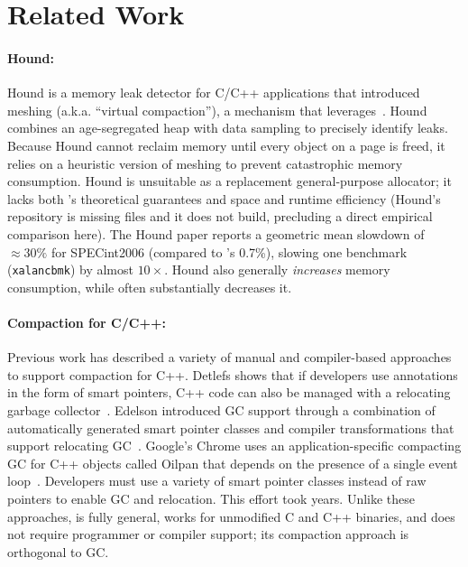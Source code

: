 \section{Related Work}
\label{sec:related-work}

\paragraph{Hound:}
\label{sec:hound}
Hound is a memory leak detector for C/C++ applications that introduced
meshing (a.k.a. ``virtual compaction''), a mechanism that \Mesh{}
leverages~\cite{1542521}. Hound combines an age-segregated heap with
data sampling to precisely identify leaks. Because Hound cannot
reclaim memory until every object on a page is freed, it relies on a
heuristic version of meshing to prevent catastrophic memory
consumption. Hound is unsuitable as a replacement general-purpose
allocator; it lacks both \Mesh's theoretical guarantees and space and
runtime efficiency (Hound's repository is missing files and it does
not build, precluding a direct empirical comparison here). The Hound
paper reports a geometric mean slowdown of $\approx 30\%$ for
SPECint2006 (compared to \Mesh{}'s 0.7\%), slowing one benchmark
(\texttt{xalancbmk}) by almost $10\times$. Hound also generally
\emph{increases} memory consumption, while \Mesh often substantially
decreases it.



\paragraph{Compaction for C/C++:}
Previous work has described a variety of manual and compiler-based
approaches to support compaction for C++. Detlefs shows that if
developers use annotations in the form of smart pointers, C++ code can
also be managed with a relocating garbage
collector~\cite{detlefs:1992:gc}.  Edelson introduced GC support
through a combination of automatically generated smart pointer classes
and compiler transformations that support relocating
GC~\cite{edelson:1992:precompilingcgc}. Google's Chrome uses an
application-specific compacting GC for C++ objects called Oilpan that
depends on the presence of a single event
loop~\cite{google:oilpan}. Developers must use a variety of smart
pointer classes instead of raw pointers to enable GC and
relocation. This effort took years. Unlike these approaches, \Mesh is
fully general, works for unmodified C and C++ binaries, and does not
require programmer or compiler support; its compaction approach is
orthogonal to GC.

